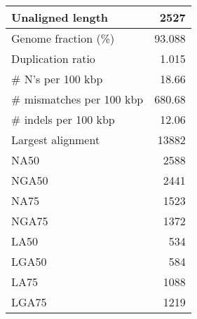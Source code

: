 \documentclass[12pt,a4paper]{article}
\begin{document}
\begin{table}[ht]
\begin{center}
\begin{tabular}{|l*{1}{|r}|}
Unaligned length & 2527 \\ \hline
Genome fraction (\%) & 93.088 \\ \hline
Duplication ratio & 1.015 \\ \hline
\# N's per 100 kbp & 18.66 \\ \hline
\# mismatches per 100 kbp & 680.68 \\ \hline
\# indels per 100 kbp & 12.06 \\ \hline
Largest alignment & 13882 \\ \hline
NA50 & 2588 \\ \hline
NGA50 & 2441 \\ \hline
NA75 & 1523 \\ \hline
NGA75 & 1372 \\ \hline
LA50 & 534 \\ \hline
LGA50 & 584 \\ \hline
LA75 & 1088 \\ \hline
LGA75 & 1219 \\ \hline
\end{tabular}
\end{center}
\end{table}
\end{document}

